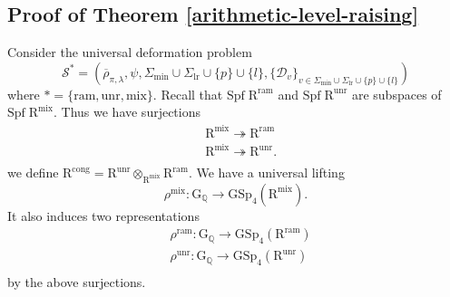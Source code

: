 \documentclass[10pt]{amsart}
\numberwithin{equation}{section}
\theoremstyle{definition}
\def\GSp{\mathrm{GSp}}
\def\min{\mathrm{min}}
\def\lr{\mathrm{lr}}
\def\mix{\mathrm{mix}}
\def\ram{\mathrm{ram}}
\def\calD{\mathcal{D}}
\def\calS{\mathcal{S}}
\def\QQ{\mathbb{Q}}
\def\rmG{\mathrm{G}}
\def\rmR{\mathrm{R}}
\def\Spf{\mathrm{Spf}}
\def\unr{\mathrm{unr}}
\begin{document}
\subsection{Proof of Theorem \ref{arithmetic-level-raising}}
Consider the universal deformation problem 
\begin{equation*}
\calS^{\ast}=(\overline{\rho}_{\pi,\lambda}, \psi, \Sigma_{\min}\cup\Sigma_{\lr}\cup\{p\}\cup\{l\}, \{\calD_{v}\}_{v\in\Sigma_{\min}\cup\Sigma_{\lr}\cup\{p\}\cup\{l\}})
\end{equation*}
where  $\ast=\{\ram, \unr, \mix\}$. Recall that $\Spf\phantom{.}\rmR^{\ram}$ and $\Spf\phantom{.}\rmR^{\unr}$ are subspaces of $\Spf\phantom{.}\rmR^{\mix}$. Thus we have surjections
\begin{equation*}
\begin{aligned}
&\rmR^{\mix}\twoheadrightarrow \rmR^{\ram}\\
&\rmR^{\mix}\twoheadrightarrow \rmR^{\unr}.\\
\end{aligned}
\end{equation*}
we define $\rmR^{\mathrm{cong}}=\rmR^{\unr}\otimes_{\rmR^{\mix}}\rmR^{\ram}$. We have a universal lifting 
\begin{equation*}
\rho^{\mix}: \rmG_{\QQ}\rightarrow \GSp_{4}(\rmR^{\mix}).
\end{equation*}
It also induces two representations
\begin{equation*}
\begin{aligned}
&\rho^{\ram}: \rmG_{\QQ}\rightarrow \GSp_{4}(\rmR^{\ram})\\
&\rho^{\unr}: \rmG_{\QQ}\rightarrow \GSp_{4}(\rmR^{\unr})\\
\end{aligned}
\end{equation*}
by the above surjections.
\end{document}
